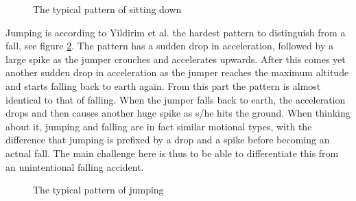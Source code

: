 \documentclass[12pt, a4paper, onecolumn]{article}
\begin{document}
	 \begin{figure}[H]
	 	\centering
	 	\caption{The typical pattern of sitting down}%
	 	\label{fig:Pattern-Sittin}%
	 \end{figure}
	
	Jumping is according to Yildirim et al. the hardest pattern to distinguish from a fall, see figure \ref{fig:Pattern-Jumping}. The pattern has a sudden drop in acceleration, followed by a large spike as the jumper crouches and accelerates upwards. After this comes yet another sudden drop in acceleration as the jumper reaches the maximum altitude and starts falling back to earth again. From this part the pattern is almost identical to that of falling. When the jumper falls back to earth, the acceleration drops and then causes another huge spike as s/he hits the ground. When thinking about it, jumping and falling are in fact similar motional types, with the difference that jumping is prefixed by a drop and a spike before becoming an actual fall. The main challenge here is thus to be able to differentiate this from an unintentional falling accident.
	
	\begin{figure}[H]
		\centering
		\caption{The typical pattern of jumping}%
		\label{fig:Pattern-Jumping}%
	\end{figure}
	
\end{document}

